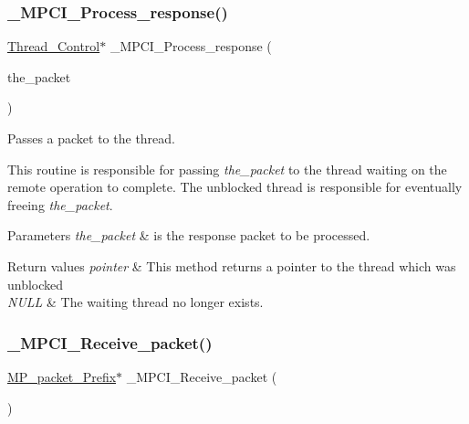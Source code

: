\subsubsection{\texorpdfstring{\_MPCI\_Process\_response()}{\_MPCI\_Process\_response()}}
{\footnotesize\ttfamily \mbox{\hyperlink{struct__Thread__Control}{Thread\+\_\+\+Control}}$\ast$ \+\_\+\+M\+P\+C\+I\+\_\+\+Process\+\_\+response (\begin{DoxyParamCaption}\item[{\mbox{\hyperlink{structMP__packet__Prefix}{M\+P\+\_\+packet\+\_\+\+Prefix}} $\ast$}]{the\+\_\+packet }\end{DoxyParamCaption})}



Passes a packet to the thread. 

This routine is responsible for passing {\itshape the\+\_\+packet} to the thread waiting on the remote operation to complete. The unblocked thread is responsible for eventually freeing {\itshape the\+\_\+packet}.


\begin{DoxyParams}{Parameters}
{\em the\+\_\+packet} & is the response packet to be processed.\\
\hline
\end{DoxyParams}

\begin{DoxyRetVals}{Return values}
{\em pointer} & This method returns a pointer to the thread which was unblocked \\
\hline
{\em N\+U\+LL} & The waiting thread no longer exists. \\
\hline
\end{DoxyRetVals}
\mbox{\label{group__RTEMSScoreMPCI_ga053f924dabe674cd71718615990e408c}} 
\subsubsection{\texorpdfstring{\_MPCI\_Receive\_packet()}{\_MPCI\_Receive\_packet()}}
{\footnotesize\ttfamily \mbox{\hyperlink{structMP__packet__Prefix}{M\+P\+\_\+packet\+\_\+\+Prefix}}$\ast$ \+\_\+\+M\+P\+C\+I\+\_\+\+Receive\+\_\+packet (\begin{DoxyParamCaption}\item[{void}]{ }\end{DoxyParamCaption})}



